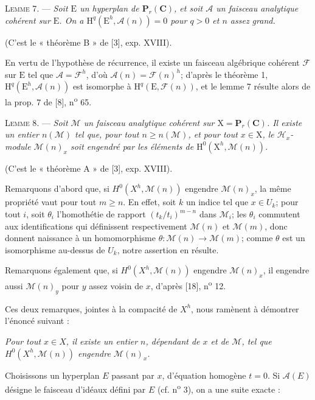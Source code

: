 \textsc{Lemme 7}. --- \textit{Soit $\mathrm{E}$ un hyperplan de $\mathbf{P}_r(\mathbf{C})$, et soit $\mathcal{A}$ un faisceau analytique cohérent sur $\mathrm{E}$. On a $\mathrm{H}^q(\mathrm{E}^h, \mathcal{A}(n)) = 0$ pour $q > 0$ et $n$ assez grand.}

(C'est le « théorème B » de [3], exp. XVIII).

En vertu de l'hypothèse de récurrence, il existe un faisceau algébrique cohérent $\mathcal{F}$ sur $\mathrm{E}$ tel que $\mathcal{A} = \mathcal{F}^h$, d'où $\mathcal{A}(n) = \mathcal{F}(n)^h$; d'après le théorème 1, $\mathrm{H}^q(\mathrm{E}^h, \mathcal{A}(n))$ est isomorphe à $\mathrm{H}^q(\mathrm{E}, \mathcal{F}(n))$, et le lemme 7 résulte alors de la prop. 7 de [8], n\textsuperscript{o} 65.

\textsc{Lemme 8}. --- \textit{Soit $\mathcal{M}$ un faisceau analytique cohérent sur $\mathrm{X} = \mathbf{P}_r(\mathbf{C})$. Il existe un entier $n(\mathcal{M})$ tel que, pour tout $n \geqslant n(\mathcal{M})$, et pour tout $x \in \mathrm{X}$, le $\mathcal{H}_x$-module $\mathcal{M}(n)_x$ soit engendré par les éléments de $\mathrm{H}^0(\mathrm{X}^h, \mathcal{M}(n))$.}

(C'est le « théorème A » de [3], exp. XVIII).



Remarquons d'abord que, si $H^0(X^h, \mathcal{M}(n))$ engendre $\mathcal{M}(n)_x$, la même propriété vaut pour tout $m \geqslant n$. En effet, soit $k$ un indice tel que $x \in U_k$; pour tout $i$, soit $\theta_i$ l'homothétie de rapport $(t_k/t_i)^{m-n}$ dans $\mathcal{M}_i$; les $\theta_i$ commutent aux identifications qui définissent respectivement $\mathcal{M}(n)$ et $\mathcal{M}(m)$, donc donnent naissance à un homomorphisme $\theta : \mathcal{M}(n) \to \mathcal{M}(m)$; comme $\theta$ est un isomorphisme au-dessus de $U_k$, notre assertion en résulte.

Remarquons également que, si $H^0(X^h, \mathcal{M}(n))$ engendre $\mathcal{M}(n)_x$, il engendre aussi $\mathcal{M}(n)_y$ pour $y$ assez voisin de $x$, d'après [18], n\textsuperscript{o} 12.

Ces deux remarques, jointes à la compacité de $X^h$, nous ramènent à démontrer l'énoncé suivant :

\textit{Pour tout $x \in X$, il existe un entier $n$, dépendant de $x$ et de $\mathcal{M}$, tel que $H^0(X^h, \mathcal{M}(n))$ engendre $\mathcal{M}(n)_x$.}

Choisissons un hyperplan $E$ passant par $x$, d'équation homogène $t = 0$. Si $\mathcal{A}(E)$ désigne le faisceau d'idéaux défini par $E$ (cf. n\textsuperscript{o} 3), on a une suite exacte :

